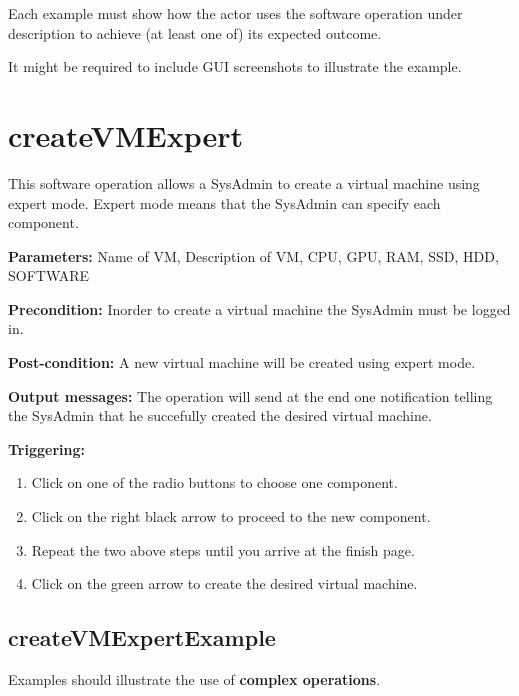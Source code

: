 Each example must show how the actor uses the software operation under
description to achieve (at least one of) its expected outcome.

It might be required to include GUI screenshots to illustrate the example.







\section{createVMExpert}
\label{operation:createVMExpert}
This software operation allows a SysAdmin to create a virtual machine using
expert mode. Expert mode means that the SysAdmin can specify each component.

\begin{description}

\item \textbf{Parameters:} Name of VM, Description of VM, CPU, GPU, RAM, SSD,
HDD, SOFTWARE
\item \textbf{Precondition:} Inorder to create a virtual machine the SysAdmin must
be logged in.
\item \textbf{Post-condition:} A new virtual machine will be created using
expert mode.
\item \textbf{Output messages:} The operation will send at the end one
notification telling the SysAdmin that he succefully created the desired virtual
machine.

\item \textbf{Triggering:}
\begin{enumerate}
\item Click on one of the radio buttons to choose one component.
\item Click on the right black arrow to proceed to the new component.
\item Repeat the two above steps until you arrive at the finish page.
\item Click on the green arrow to create the desired virtual machine.
\end{enumerate}

 
\end{description}

 
\subsection{createVMExpertExample}
Examples should illustrate the use of \textbf{complex operations}.

